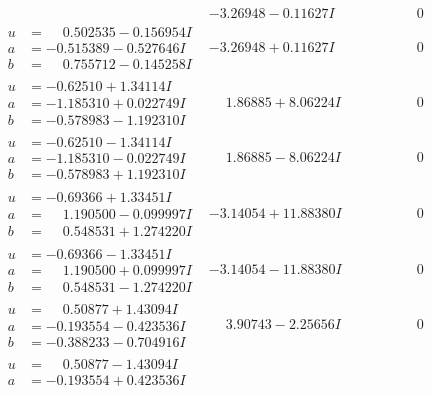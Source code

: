 \documentclass[1p]{elsarticle_modified}
\theoremstyle{definition}
\begin{document}
$$\begin{array}{c|c|c}
 & -3.26948 - 0.11627 I & \phantom{-0.000000 } 0 \\ \hline\begin{aligned}
u &= \phantom{-}0.502535 - 0.156954 I \\
a &= -0.515389 - 0.527646 I \\
b &= \phantom{-}0.755712 - 0.145258 I\end{aligned}
 & -3.26948 + 0.11627 I & \phantom{-0.000000 } 0 \\ \hline\begin{aligned}
u &= -0.62510 + 1.34114 I \\
a &= -1.185310 + 0.022749 I \\
b &= -0.578983 - 1.192310 I\end{aligned}
 & \phantom{-}1.86885 + 8.06224 I & \phantom{-0.000000 } 0 \\ \hline\begin{aligned}
u &= -0.62510 - 1.34114 I \\
a &= -1.185310 - 0.022749 I \\
b &= -0.578983 + 1.192310 I\end{aligned}
 & \phantom{-}1.86885 - 8.06224 I & \phantom{-0.000000 } 0 \\ \hline\begin{aligned}
u &= -0.69366 + 1.33451 I \\
a &= \phantom{-}1.190500 - 0.099997 I \\
b &= \phantom{-}0.548531 + 1.274220 I\end{aligned}
 & -3.14054 + 11.88380 I & \phantom{-0.000000 } 0 \\ \hline\begin{aligned}
u &= -0.69366 - 1.33451 I \\
a &= \phantom{-}1.190500 + 0.099997 I \\
b &= \phantom{-}0.548531 - 1.274220 I\end{aligned}
 & -3.14054 - 11.88380 I & \phantom{-0.000000 } 0 \\ \hline\begin{aligned}
u &= \phantom{-}0.50877 + 1.43094 I \\
a &= -0.193554 - 0.423536 I \\
b &= -0.388233 - 0.704916 I\end{aligned}
 & \phantom{-}3.90743 - 2.25656 I & \phantom{-0.000000 } 0 \\ \hline\begin{aligned}
u &= \phantom{-}0.50877 - 1.43094 I \\
a &= -0.193554 + 0.423536 I \\

\end{aligned}
\end{array}$$
\end{document}
